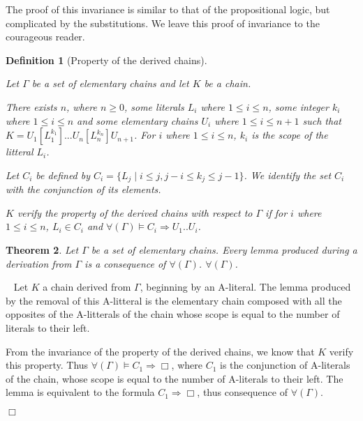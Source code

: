 \documentclass{article}
\newtheorem{theoreme}{Theorem}\newtheorem{lemme}[theoreme]{Lemma}
\newtheorem{definition}[theoreme]{Definition}
\newenvironment{preuve}{\noindent {\em Proof :}\ }{{\hfill
    $\Box$}\vspace{.5pc}} \newcommand{\sg}{\!\!<\!\!}
\begin{document}
The proof of this invariance is similar to that of the propositional logic, but complicated by the substitutions.
We leave this proof of invariance to the courageous reader.




\begin{definition}[Property of the derived chains]\label{prop-chaine-derivee-1}

Let $\Gamma$ be a set of elementary chains and let $K$ be a chain.

There exists $n$, where $n \geq 0$,  some literals $L_i$ where $1 \leq i \leq n$, some integer $k_i$ where $1 \leq i \leq n$
and some elementary chains
 $U_i$ where $1 \leq i \leq n+1$ such that \\$K = U_1[L_1^{k_1}]...U_n[L_n^{k_n}]U_{n+1}$.
For $i$ where $1 \leq i \leq n$, $k_i$ is the scope of the litteral $L_i$.

Let $C_i$ be defined by 
 $C_i = \{ L_j \mid i \leq j, j-i \leq k_j \leq j-1\}$.
We identify the set $C_i$ with the  \emph{conjunction} of its elements.


$K$ verify the property of the derived chains with respect to $\Gamma$ if
for $i$  where $1 \leq i \leq n$, $L_i \in C_i$ and $\forall(\Gamma) \models C_i \Rightarrow U_1.. U_i$.
\end{definition}



\begin{theoreme}
Let $\Gamma$ be a set of elementary chains.
Every lemma produced during a derivation from $\Gamma$ is a consequence of $\forall(\Gamma)$.
$\forall(\Gamma)$.
\end{theoreme}

\begin{preuve}
Let $K$ a chain derived from $\Gamma$, beginning by an A-literal. The lemma produced by the removal of this A-litteral is
the elementary chain composed with all the opposites of the 
A-litterals of the chain whose scope is equal to the number of literals to their left.

From the invariance of the property of the derived chains, we 
know that $K$ verify this property. Thus $\forall(\Gamma) \models C_1 \Rightarrow \Box$, where $C_1$ is the conjunction
of A-literals of the chain, whose scope is equal to the number of A-literals to their left. The lemma is equivalent to
the formula $C_1 \Rightarrow \Box$, thus consequence of $\forall(\Gamma)$.

\end{preuve}
\end{document}
